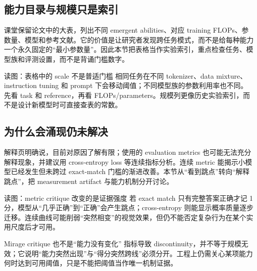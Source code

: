 \subsection{能力目录与规模只是索引}

课堂保留论文中的大表，列出不同 emergent abilities、对应 training FLOPs、参数量、模型和参考文献。它的价值是让研究者发现跨任务模式，而不是给每种能力一个永久固定的“最小参数量”。因此本节把表格当作实验索引，重点检查任务、模型族和评测设置，而不是背诵门槛数字。


\begin{knowledgebox}{读图：表格中的 scale 不是普适门槛}
相同任务在不同 tokenizer、data mixture、instruction tuning 和 prompt 下会移动阈值；不同模型族的参数利用率也不同。先看 task 和 reference，再看 FLOPs/parameters。规模列更像历史实验索引，而不是设计新模型时可直接查表的常数。
\end{knowledgebox}

\subsection{为什么会涌现仍未解决}

解释页明确说，目前对原因了解有限；使用的 evaluation metrics 也可能无法充分解释现象，并建议用 cross-entropy loss 等连续指标分析。连续 metric 能揭示小模型已经发生但未跨过 exact-match 门槛的渐进改善。本节从“看到跳点”转向“解释跳点”，把 measurement artifact 与能力机制分开讨论。


\begin{knowledgebox}{读图：metric critique 改变的是证据强度}
若 exact match 只有完整答案正确才记 1 分，模型从“几乎正确”到“正确”会产生跳点；cross-entropy 则能显示概率质量逐步迁移。连续曲线可能削弱“突然相变”的视觉效果，但仍不能否定复杂行为在某个实用尺度后才可用。
\end{knowledgebox}

\begin{warningbox}{Mirage critique 也不是“能力没有变化”}
指标导致 discontinuity，并不等于规模无效；它说明“能力突然出现”与“得分突然跨线”必须分开。工程上仍需关心某项能力何时达到可用阈值，只是不能把阈值当作唯一机制证据。
\end{warningbox}


